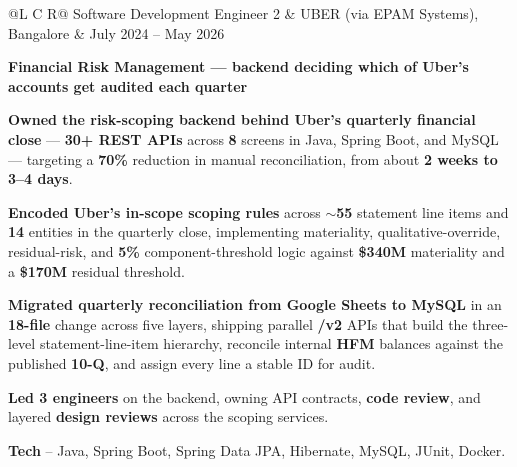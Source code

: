 \vspace{0.6ex}
\noindent
\begin{tabularx}{\textwidth}{@{}L C R@{}}
\textcolor{role}{Software Development Engineer 2} & \textcolor{company}{UBER (via EPAM Systems), Bangalore} & \textcolor{date}{July 2024 -- May 2026}\\
\end{tabularx}
\vspace{-1.6ex}

\textcolor{Project}{\textbf{Financial Risk Management --- backend deciding which of Uber's accounts get audited each quarter}}
\vspace{-0.6ex}
\begin{zitemize}
    \item \textbf{Owned the risk-scoping backend behind Uber's quarterly financial close} --- \textbf{30+ REST APIs} across \textbf{8} screens in Java, Spring Boot, and MySQL --- targeting a \textbf{70\%} reduction in manual reconciliation, from about \textbf{2 weeks to 3--4 days}.
    \item \textbf{Encoded Uber's in-scope scoping rules} across \textbf{$\sim$55} statement line items and \textbf{14} entities in the quarterly close, implementing materiality, qualitative-override, residual-risk, and \textbf{5\%} component-threshold logic against \textbf{\$340M} materiality and a \textbf{\$170M} residual threshold.
    \item \textbf{Migrated quarterly reconciliation from Google Sheets to MySQL} in an \textbf{18-file} change across five layers, shipping parallel \textbf{/v2} APIs that build the three-level statement-line-item hierarchy, reconcile internal \textbf{HFM} balances against the published \textbf{10-Q}, and assign every line a stable ID for audit.
    \item \textbf{Led 3 engineers} on the backend, owning API contracts, \textbf{code review}, and layered \textbf{design reviews} across the scoping services.
    \item \textbf{Tech} -- Java, Spring Boot, Spring Data JPA, Hibernate, MySQL, JUnit, Docker.
\end{zitemize}
\vspace{0.5ex}

